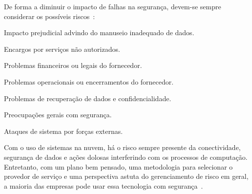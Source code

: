 De forma a diminuir o impacto de falhas na segurança, devem-se sempre considerar os
possíveis riscos~\cite{cloud-computing-fundamentals}:
\begin{itemise}
    \item Impacto prejudicial advindo do manuseio inadequado de dados.
    \item Encargos por serviços não autorizados.
    \item Problemas financeiros ou legais do fornecedor.
    \item Problemas operacionais ou encerramentos do fornecedor.
    \item Problemas de recuperação de dados e confidencialidade.
    \item Preocupações gerais com segurança.
    \item Ataques de sistema por forças externas.
\end{itemise}

Com o uso de sistemas na nuvem, há o risco sempre presente da conectividade,
segurança de dados e ações dolosas interferindo com os processos de computação.
Entretanto, com um plano bem pensado, uma metodologia para selecionar o provedor
de serviço e uma perspectiva astuta do gerenciamento de risco em geral, a maioria
das empresas pode usar essa tecnologia com segurança~\cite{cloud-computing-fundamentals}. 
